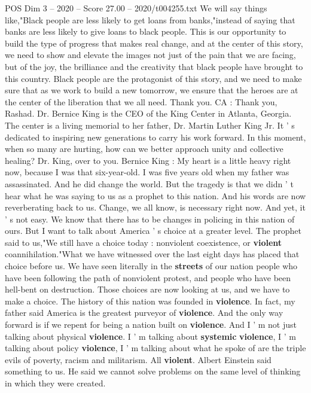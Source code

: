 \begin{textsample}{POS Dim 3 – 2020 – Score 27.00 – 2020/t004255.txt}
We will say things like,"Black people are less likely to get loans from banks,"instead of saying that banks are less likely to give loans to black people.
This is our opportunity to build the type of progress that makes real change, and at the center of this story, we need to show and elevate the images not just of the pain that we are facing, but of the joy, the brilliance and the creativity that black people have brought to this country.
Black people are the protagonist of this story, and we need to make sure that as we work to build a new tomorrow, we ensure that the heroes are at the center of the liberation that we all need.
Thank you.
CA : Thank you, Rashad.
Dr.
Bernice King is the CEO of the King Center in Atlanta, Georgia.
The center is a living memorial to her father, Dr.
Martin Luther King Jr.
It ' s dedicated to inspiring new generations to carry his work forward.
In this moment, when so many are hurting, how can we better approach unity and collective healing?
Dr.
King, over to you.
Bernice King : My heart is a little heavy right now, because I was that six-year-old.
I was five years old when my father was assassinated.
And he did change the world.
But the tragedy is that we didn ' t hear what he was saying to us as a prophet to this nation.
And his words are now reverberating back to us.
Change, we all know, is necessary right now.
And yet, it ' s not easy.
We know that there has to be changes in policing in this nation of ours.
But I want to talk about America ' s choice at a greater level.
The prophet said to us,"We still have a choice today : nonviolent coexistence, or \textbf{violent} coannihilation."What we have witnessed over the last eight days has placed that choice before us.
We have seen literally in the \textbf{streets} of our nation people who have been following the path of nonviolent protest, and people who have been hell-bent on destruction.
Those choices are now looking at us, and we have to make a choice.
The history of this nation was founded in \textbf{violence}.
In fact, my father said America is the greatest purveyor of \textbf{violence}.
And the only way forward is if we repent for being a nation built on \textbf{violence}.
And I ' m not just talking about physical \textbf{violence}.
I ' m talking about \textbf{systemic} \textbf{violence}, I ' m talking about policy \textbf{violence}, I ' m talking about what he spoke of are the triple evils of poverty, racism and militarism.
All \textbf{violent}.
Albert Einstein said something to us.
He said we cannot solve problems on the same level of thinking in which they were created.

\end{textsample}
